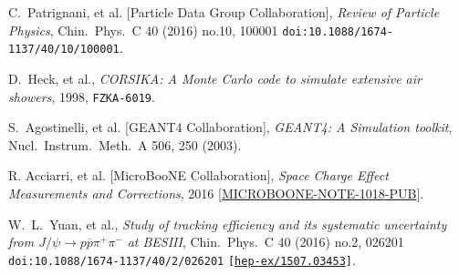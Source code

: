 \documentclass[a4paper,11pt]{article}
\begin{document}
\begin{thebibliography}{99}
   C.~Patrignani, et al. [Particle Data Group Collaboration], \textit{Review of Particle Physics}, Chin.\ Phys.\ C 40 (2016) no.10,  100001 \texttt{doi:10.1088/1674-1137/40/10/100001}.

   D.~Heck, et al.,
  \textit{CORSIKA: A Monte Carlo code to simulate extensive air showers}, 1998,
  \texttt{FZKA-6019}.

   S.~Agostinelli, et al. [GEANT4 Collaboration], \textit{GEANT4: A Simulation toolkit}, Nucl.\ Instrum.\ Meth.\ A {506}, 250 (2003).

   R. Acciarri, et al. [MicroBooNE Collaboration], \textit{Space Charge Effect Measurements and Corrections}, 2016 [\href{http://www-microboone.fnal.gov/publications/publicnotes/index.html}{MICROBOONE-NOTE-1018-PUB}].

   W.~L.~Yuan, et al., \textit{Study of tracking efficiency and its systematic uncertainty from $J/\psi \to p \overline{p} \pi^+ \pi^-$ at BESIII}, Chin.\ Phys.\ C 40 (2016) no.2,  026201 \texttt{doi:10.1088/1674-1137/40/2/026201}  \texttt{[\href{https://arxiv.org/abs/1506.05348}{hep-ex/1507.03453}]}.





\end{thebibliography}
\end{document}
